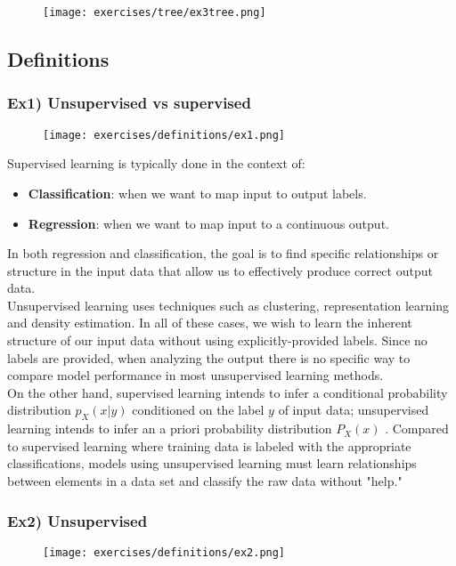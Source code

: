 \begin{figure}[H]
    \centering
    \texttt{[image: exercises/tree/ex3tree.png]}
\end{figure}

\subsection{Definitions}

\subsubsection{Ex1) Unsupervised vs supervised}
\begin{figure}[H]
    \centering
    \texttt{[image: exercises/definitions/ex1.png]}
\end{figure}

Supervised learning is typically done in the context of:
\begin{itemize}
\item \textbf{Classification}: when we want to map input to output labels.
\item \textbf{Regression}: when we want to map input to a continuous output.
\end{itemize} 

In both regression and classification, the goal is to find specific relationships or structure in the input data that allow us to effectively produce correct output data.\\

Unsupervised learning uses techniques such as clustering, representation learning and density estimation. In all of these cases, we wish to learn the inherent structure of our input data without using explicitly-provided labels. Since no labels are provided, when analyzing the output there is no specific way to compare model performance in most unsupervised learning methods.\\
 
On the other hand, supervised learning  intends to infer a conditional probability distribution $p_X(x|y)$ conditioned on the label $y$ of input data; unsupervised learning intends to infer an a priori probability distribution $P_X(x)$ . Compared to supervised learning where training data is labeled with the appropriate classifications, models using unsupervised learning must learn relationships between elements in a data set and classify the raw data without "help."

\subsubsection{Ex2) Unsupervised}
\begin{figure}[H]
    \centering
    \texttt{[image: exercises/definitions/ex2.png]}
\end{figure}

